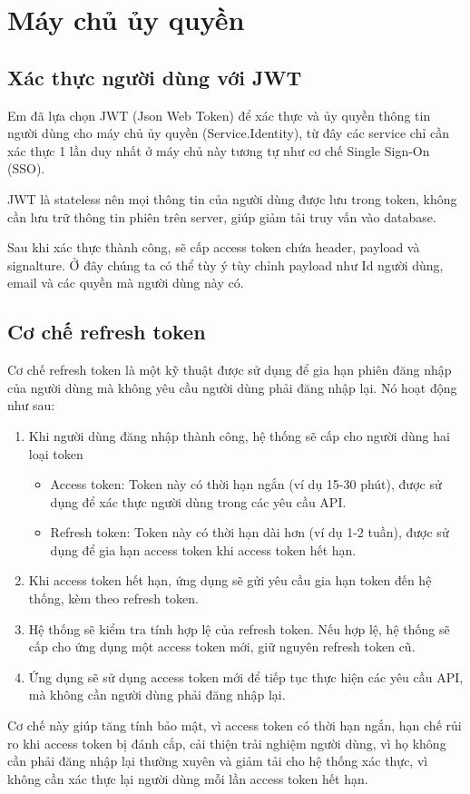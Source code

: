 \documentclass[../index.tex]{subfiles}
\begin{document}
    \section{Máy chủ ủy quyền}
    \subsection{Xác thực người dùng với JWT}
    Em đã lựa chọn JWT (Json Web Token) để xác thực và ủy quyền thông tin người dùng cho máy chủ ủy quyền (Service.Identity), từ đây các service chỉ cần xác thực 1 lần duy nhất ở máy chủ này tương tự như cơ chế Single Sign-On (SSO).
    
    JWT là stateless nên mọi thông tin của người dùng được lưu trong token, không cần lưu trữ thông tin phiên trên server, giúp giảm tải truy vấn vào database. 
    
    Sau khi xác thực thành công, sẽ cấp access token chứa header, payload và signalture. Ở đây chúng ta có thể tùy ý tùy chỉnh payload như Id người dùng, email và các quyền mà người dùng này có.
    
    \subsection{Cơ chế refresh token}
    Cơ chế refresh token là một kỹ thuật được sử dụng để gia hạn phiên đăng nhập của người dùng mà không yêu cầu người dùng phải đăng nhập lại. Nó hoạt động như sau:
    \begin{enumerate}
        \item Khi người dùng đăng nhập thành công, hệ thống sẽ cấp cho người dùng hai loại token
            \begin{itemize}
                \item Access token: Token này có thời hạn ngắn (ví dụ 15-30 phút), được sử dụng để xác thực người dùng trong các yêu cầu API.
                \item Refresh token: Token này có thời hạn dài hơn (ví dụ 1-2 tuần), được sử dụng để gia hạn access token khi access token hết hạn.
            \end{itemize}
        \item Khi access token hết hạn, ứng dụng sẽ gửi yêu cầu gia hạn token đến hệ thống, kèm theo refresh token.
        \item Hệ thống sẽ kiểm tra tính hợp lệ của refresh token. Nếu hợp lệ, hệ thống sẽ cấp cho ứng dụng một access token mới, giữ nguyên refresh token cũ.
        \item Ứng dụng sẽ sử dụng access token mới để tiếp tục thực hiện các yêu cầu API, mà không cần người dùng phải đăng nhập lại.
    \end{enumerate}
    Cơ chế này giúp tăng tính bảo mật, vì access token có thời hạn ngắn, hạn chế rủi ro khi access token bị đánh cắp, cải thiện trải nghiệm người dùng, vì họ không cần phải đăng nhập lại thường xuyên và giảm tải cho hệ thống xác thực, vì không cần xác thực lại người dùng mỗi lần access token hết hạn.
    
\end{document}
